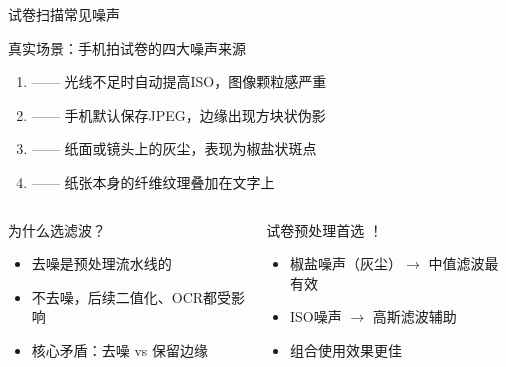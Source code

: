 \begin{frame}{试卷扫描常见噪声}
	\begin{alertblock}{真实场景：手机拍试卷的四大噪声来源}
		\begin{enumerate}
			\item {} —— 光线不足时自动提高ISO，图像颗粒感严重
			\item {} —— 手机默认保存JPEG，边缘出现方块状伪影
			\item {} —— 纸面或镜头上的灰尘，表现为椒盐状斑点
			\item {} —— 纸张本身的纤维纹理叠加在文字上
		\end{enumerate}
	\end{alertblock}

	\vspace{0.3cm}

	\begin{columns}
		\begin{block}{为什么选滤波？}
			\begin{itemize}
				\item 去噪是预处理流水线的
				\item 不去噪，后续二值化、OCR都受影响
				\item 核心矛盾：去噪 vs 保留边缘
			\end{itemize}
		\end{block}

		\begin{tcolorbox}[colback=red!5!white,colframe=red!70!black,title=\textbf{结论}]
			试卷预处理首选 ！
			\begin{itemize}
				\item 椒盐噪声（灰尘）$\to$ 中值滤波最有效
				\item ISO噪声 $\to$ 高斯滤波辅助
				\item 组合使用效果更佳
			\end{itemize}
		\end{tcolorbox}
	\end{columns}
\end{frame}

